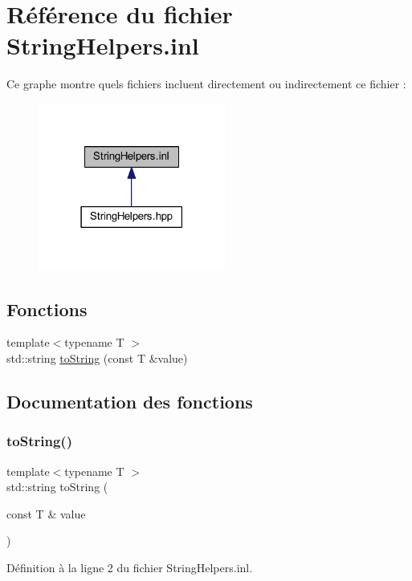 \hypertarget{_string_helpers_8inl}{}\section{Référence du fichier String\+Helpers.\+inl}
\label{_string_helpers_8inl}
Ce graphe montre quels fichiers incluent directement ou indirectement ce fichier \+:
\nopagebreak
\begin{figure}[H]
\begin{center}
\leavevmode
\includegraphics[width=174pt]{_string_helpers_8inl__dep__incl}
\end{center}
\end{figure}
\subsection*{Fonctions}
\begin{DoxyCompactItemize}
\item 
{\footnotesize template$<$typename T $>$ }\\std\+::string \hyperlink{_string_helpers_8inl_a1e803cea7d2670ece91f5465281446ba}{to\+String} (const T \&value)
\end{DoxyCompactItemize}


\subsection{Documentation des fonctions}
\hypertarget{_string_helpers_8inl_a1e803cea7d2670ece91f5465281446ba}{}\label{_string_helpers_8inl_a1e803cea7d2670ece91f5465281446ba} 
\subsubsection{\texorpdfstring{to\+String()}{toString()}}
{\footnotesize\ttfamily template$<$typename T $>$ \\
std\+::string to\+String (\begin{DoxyParamCaption}\item[{const T \&}]{value }\end{DoxyParamCaption})}



Définition à la ligne 2 du fichier String\+Helpers.\+inl.

